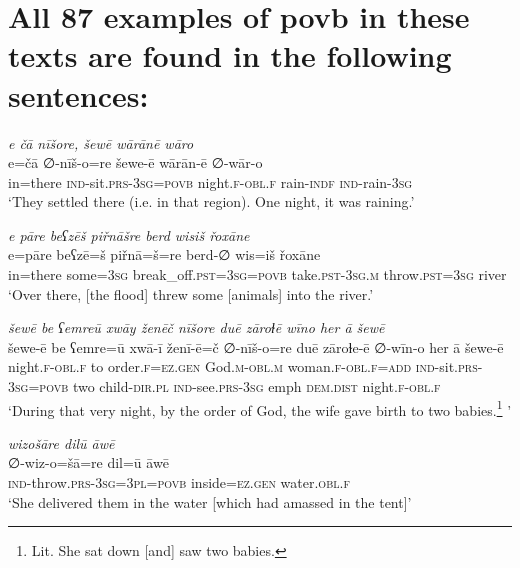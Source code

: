\chapter{All 87 examples of povb in these texts are found in the following sentences:}

\ea \label{ZB.10}
\textit{e čā nīšore, šewē wārānē wāro} \\ 
\gll e=čā ∅-nīš-o=re šewe-ē wārān-ē ∅-wār-o \\ 
 in=there \textsc{ind-}sit\textsc{.prs}\textsc{-3sg}\textsc{=\textsc{povb}} night\textsc{.f}\textsc{-obl}\textsc{.f} rain\textsc{-indf} \textsc{ind-}rain\textsc{-3sg} \\ 
\glt `They settled there (i.e. in that region). One night, it was raining.'
\z 
 
\ea \label{ZB.22}
\textit{e pāre beʕzēš piřnāšre berd wisiš řoxāne} \\ 
\gll e=pāre beʕzē=š piřnā=š=re berd-∅ wis=iš řoxāne \\ 
 in=there some\textsc{=3sg} break\_off\textsc{.pst}\textsc{=3sg}\textsc{=\textsc{povb}} take\textsc{.pst}\textsc{-3sg}\textsc{.m} throw\textsc{.pst}\textsc{=3sg} river \\ 
\glt `Over there, [the flood] threw some [animals] into the river.'
\z 
 
\ea \label{ZB.24}
\textit{šewē be ʕemreū xwāy ženēč nīšore duē zāroɫē wīno her ā šewē} \\ 
\gll šewe-ē be ʕemre=ū xwā-ī ženī-ē=č ∅-nīš-o=re duē zāroɫe-ē ∅-wīn-o her ā šewe-ē \\ 
 night\textsc{.f}\textsc{-obl}\textsc{.f} to order\textsc{.f}\textsc{\textsc{=ez.gen}} God\textsc{.m}\textsc{-obl}\textsc{.m} woman\textsc{.f}\textsc{-obl}\textsc{.f}\textsc{=add} \textsc{ind-}sit\textsc{.prs}\textsc{-3sg}\textsc{=\textsc{povb}} two child\textsc{-dir}\textsc{.pl} \textsc{ind-}see\textsc{.prs}\textsc{-3sg} emph \textsc{dem.dist} night\textsc{.f}\textsc{-obl}\textsc{.f} \\ 
\glt `During that very night, by the order of God, the wife gave birth to two babies.\footnote{Lit. She sat down [and] saw two babies.} '
\z 
 
\ea \label{ZB.25}
\textit{wizošāre dilū āwē} \\ 
\gll ∅-wiz-o=šā=re dil=ū āwē \\ 
 \textsc{ind-}throw\textsc{.prs}\textsc{-3sg=3pl}\textsc{=\textsc{povb}} inside\textsc{\textsc{=ez.gen}} water\textsc{.obl}\textsc{.f} \\ 
\glt `She delivered them in the water [which had amassed in the tent]'
\z 
 
